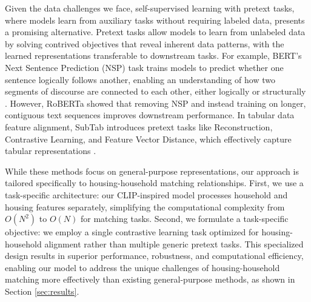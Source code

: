 Given the data challenges we face, self-supervised learning with pretext tasks, where models learn from auxiliary tasks without requiring labeled data, presents a promising alternative. Pretext tasks allow models to learn from unlabeled data by solving contrived objectives that reveal inherent data patterns, with the learned representations transferable to downstream tasks. For example, BERT’s Next Sentence Prediction (NSP) task trains models to predict whether one sentence logically follows another, enabling an understanding of how two segments of discourse are connected to each other, either logically or structurally \cite{devlin2018bert}. However, RoBERTa \cite{liu2019roberta} showed that removing NSP and instead training on longer, contiguous text sequences improves downstream performance. In tabular data feature alignment, SubTab introduces pretext tasks like Reconstruction, Contrastive Learning, and Feature Vector Distance, which effectively capture tabular representations \cite{ucar2021subtab}. 

While these methods focus on general-purpose representations, our approach is tailored specifically to housing-household matching relationships. First, we use a task-specific architecture: our CLIP-inspired model processes household and housing features separately, simplifying the computational complexity from $O(N^2)$ to $O(N)$ for matching tasks. Second, we formulate a task-specific objective: we employ a single contrastive learning task optimized for housing-household alignment rather than multiple generic pretext tasks. This specialized design results in superior performance, robustness, and computational efficiency, enabling our model to address the unique challenges of housing-household matching more effectively than existing general-purpose methods, as shown in Section \ref{sec:results}.